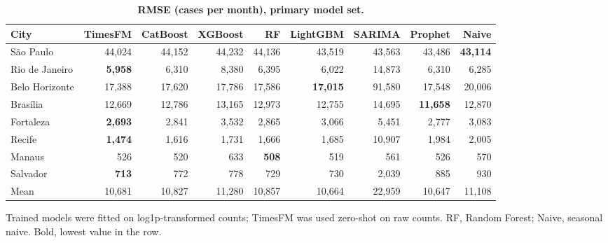 
\begin{table}[!ht]
\centering
\small
\caption{\textbf{RMSE (cases per month), primary model set.}}
\begin{tabular}{lrrrrrrrr}
\toprule
City & TimesFM & CatBoost & XGBoost & RF & LightGBM & SARIMA & Prophet & Naive \\
\midrule
S\~ao Paulo & 44{,}024 & 44{,}152 & 44{,}232 & 44{,}136 & 43{,}519 & 43{,}563 & 43{,}486 & \textbf{43{,}114} \\
Rio de Janeiro & \textbf{5{,}958} & 6{,}310 & 8{,}380 & 6{,}395 & 6{,}022 & 14{,}873 & 6{,}310 & 6{,}285 \\
Belo Horizonte & 17{,}388 & 17{,}620 & 17{,}786 & 17{,}586 & \textbf{17{,}015} & 91{,}580 & 17{,}548 & 20{,}006 \\
Bras\'ilia & 12{,}669 & 12{,}786 & 13{,}165 & 12{,}973 & 12{,}755 & 14{,}695 & \textbf{11{,}658} & 12{,}870 \\
Fortaleza & \textbf{2{,}693} & 2{,}841 & 3{,}532 & 2{,}865 & 3{,}066 & 5{,}451 & 2{,}777 & 3{,}083 \\
Recife & \textbf{1{,}474} & 1{,}616 & 1{,}731 & 1{,}666 & 1{,}685 & 10{,}907 & 1{,}984 & 2{,}005 \\
Manaus & 526 & 520 & 633 & \textbf{508} & 519 & 561 & 526 & 570 \\
Salvador & \textbf{713} & 772 & 778 & 729 & 730 & 2{,}039 & 885 & 930 \\
\midrule
Mean & 10{,}681 & 10{,}827 & 11{,}280 & 10{,}857 & 10{,}664 & 22{,}959 & 10{,}647 & 11{,}108 \\
\bottomrule
\end{tabular}
\begin{flushleft} Trained models were fitted on log1p-transformed counts; TimesFM was used zero-shot on raw counts. RF, Random Forest; Naive, seasonal naive. Bold, lowest value in the row.
\end{flushleft}
\label{tabC}
\end{table}
